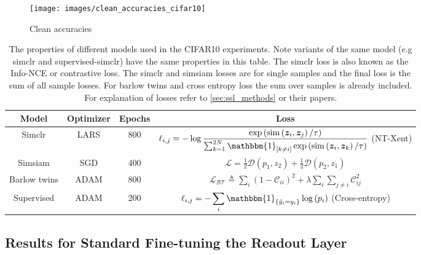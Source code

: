 \documentclass[../thesis.tex]{subfiles}
\begin{document}
	
	\begin{figure}
		\centering
		\texttt{[image: images/clean\_accuracies\_cifar10]}
		\caption{Clean accuracies}
		\label{fig:cleanaccuraciescifar10}
	\end{figure}
	
	
	\begin{table}
		\begin{tabular}{|c|c|c|c|}
			\hline
			Model&			Optimizer&		Epochs&		\rule[-2em]{0pt}{1em}\rule{0pt}{2em} Loss\\
			\hline
			Simclr&			LARS\cite{lars}&	800&  \rule[-2em]{0pt}{1em}\rule{0pt}{2em}  \(\displaystyle \ell_{i, j}=-\log \frac{\exp \left(\operatorname{sim}\left(\boldsymbol{z}_{i}, \boldsymbol{z}_{j}\right) / \tau\right)}{\sum_{k=1}^{2 N} \mathbbm{1}_{[k \neq i]} \exp \left(\operatorname{sim}\left(\boldsymbol{z}_{i}, \boldsymbol{z}_{k}\right) / \tau\right)}  \) \medspace (NT-Xent)	\\
			\hline
			Simsiam&		SGD&  				400&  	\rule[-2em]{0pt}{1em}\rule{0pt}{2em}\(\displaystyle \mathcal{L}=\frac{1}{2} \mathcal{D}\left(p_{1}, z_{2}\right)+\frac{1}{2} \mathcal{D}\left(p_{2}, z_{1}\right) \)	\\
			\hline
			Barlow twins&	ADAM&  				800&    \rule[-2em]{0pt}{1em}\rule{0pt}{2em}\(\displaystyle \mathcal{L}_{\mathcal{B} \mathcal{T}} \triangleq \sum_{i}\left(1-\mathcal{C}_{i i}\right)^{2}+\lambda \sum_{i} \sum_{j \neq i} \mathcal{C}_{i j}^{2} \)	\\
			\hline
			Supervised&  	ADAM&				200&    \rule[-2em]{0pt}{1em}\rule{0pt}{2em} \(\displaystyle \ell_{i, j} = -\sum_{i} \mathbbm{1}_{\{\hat{y}_i=y_i\}}\log \left(p_i\right) \) \medspace (Cross-entropy) \\
			\hline
		\end{tabular}
		\caption{The properties of different models used in the CIFAR10 experiments. Note variants of the same model (e.g simclr and supervised-simclr) have the same properties in this table. The simclr loss is also known as the Info-NCE or contrastive loss. The simclr and simsiam losses are for single samples and the final loss is the sum of all sample losses. For barlow twins and cross entropy loss the sum over samples is already included. For explanation of losses refer to \ref{sec:ssl_methods} or their papers.}
		\label{tab:model_info}
	\end{table}
	
	\subsection{Results for Standard Fine-tuning the Readout Layer}
	
\end{document}
